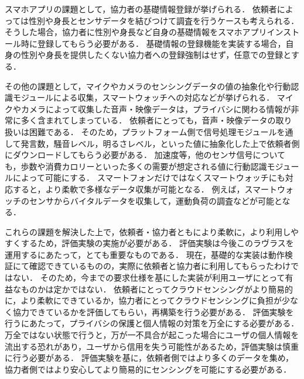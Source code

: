 スマホアプリの課題として，協力者の基礎情報登録が挙げられる．
依頼者によっては性別や身長とセンサデータを結びつけて調査を行うケースも考えられる．
そうした場合，協力者に性別や身長など自身の基礎情報をスマホアプリインストール時に登録してもらう必要がある．
基礎情報の登録機能を実装する場合，自身の性別や身長を提供したくない協力者への登録強制はせず，任意での登録とする．



その他の課題として，マイクやカメラのセンシングデータの値の抽象化や行動認識モジュールによる収集，スマートウォッチへの対応などが挙げられる．
マイクやカメラによって収集した音声・映像データは，プライバシに関わる情報が非常に多く含まれてしまっている．
依頼者にとっても，音声・映像データの取り扱いは困難である．
そのため，プラットフォーム側で信号処理モジュールを通して発言数，騒音レベル，明るさレベル，といった値に抽象化した上で依頼者側にダウンロードしてもらう必要がある．
加速度等，他のセンサ信号についても，歩数や消費カロリーといった多くの需要が想定される値に行動認識モジュールによって可能にする．
スマートフォンだけではなくスマートウォッチにも対応すると，より柔軟で多様なデータ収集が可能となる．
例えば，スマートウォッチのセンサからバイタルデータを収集して，運動負荷の調査などが可能となる．

これらの課題を解決した上で，依頼者・協力者ともにより柔軟に，より利用しやすくするため，評価実験の実施が必要がある．
評価実験は今後このラヴラスを運用するにあたって，とても重要なものである．
現在，基礎的な実装は動作検証にて確認できているものの，実際に依頼者と協力者に利用してもらったわけではない．
そのため，今までの要求仕様を基にした実装が利用ユーザにとって有益なものかは定かではない．
依頼者にとってクラウドセンシングがより簡易的に，より柔軟にできているか，協力者にとってクラウドセンシングに負担が少なく協力できているかを評価してもらい，再構築を行う必要がある．
評価実験を行うにあたって，プライバシの保護と個人情報の対策を万全にする必要がある．
万全ではない状態で行うと，万が一不具合が起こった場合にユーザの個人情報を流出する恐れがあり，ユーザから信用を失う可能性があるため，評価実験は慎重に行う必要がある．
評価実験を基に，依頼者側ではより多くのデータを集め，協力者側ではより安心してより簡易的にセンシングを可能にする必要がある．
